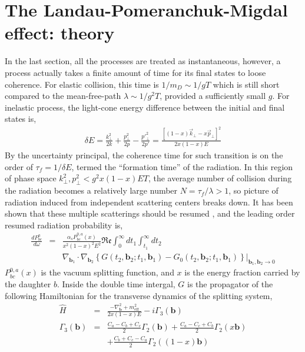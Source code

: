 \section{The Landau-Pomeranchuk-Migdal effect: theory}
In the last section, all the processes are treated as instantaneous, however, a process actually takes a finite amount of time for its final states to loose coherence. 
For elastic collision, this time is $1/m_D \sim 1/gT$ which is still short compared to the mean-free-path $\lambda \sim 1/g^2 T$, provided a sufficiently small $g$.
For inelastic process, the light-cone energy difference between the initial and final states is,
\begin{eqnarray}
\delta E = \frac{k_\perp^2}{2k} + \frac{p_\perp^2}{2p} - \frac{{p'}_\perp^2}{2{p'}} = \frac{ [(1-x)\vec{k}_\perp - x\vec{p}_\perp]^2}{2x(1-x)E}
\end{eqnarray}
By the uncertainty principal, the coherence time for such transition is on the order of $\tau_f = 1/\delta E$, termed the ``formation time'' of the radiation. 
In this region of phase space $k_\perp^2, p_\perp^2 < g^2x(1-x)ET$, the average number of collision during the radiation becomes a relatively large number $N = \tau_f/\lambda >1$, so picture of radiation induced from independent scattering centers breaks down.
It has been shown that these multiple scatterings should be resumed \cite{Zakharov:1996fv,Zakharov:1997uu,Baier:1996kr}, and the leading order resumed radiation probability is,
\begin{eqnarray}
\nonumber
\frac{dP^{a}_{bc}}{d\omega} &=& \frac{\alpha_s P^{0,a}_{bc}(x)}{x^2(1-x)^2 E^2}\mathfrak{Re}\int_0^\infty dt_1 \int_{t_1}^{\infty} dt_2\\ &&\nabla_{\mathbf{b}_1} \cdot\nabla_{\mathbf{b}_2} \left\{G(t_2, \mathbf{b}_2; t_1, \mathbf{b}_1) - G_0(t_2, \mathbf{b}_2; t_1, \mathbf{b}_1) \right\}|_{\mathbf{b}_1, \mathbf{b}_2 \rightarrow 0}
\label{eq:theory-dR}
\end{eqnarray}
$P^{0,a}_{bc}(x)$ is the vacuum splitting function, and $x$ is the energy fraction carried by the daughter $b$.
Inside the double time intergal, $G$ is the propagator of the following Hamiltonian for the transverse dynamics of the splitting system,
\begin{eqnarray}
\hat{H} &=& \frac{-\nabla^2_{\mathbf{b}} + m^2_\textrm{eff}}{2x(1-x)E} - i \Gamma_3(\mathbf{b})\\
\Gamma_3(\mathbf{b}) &=& \frac{C_a-C_b+C_c}{2}\Gamma_2(\mathbf{b}) + \frac{C_a-C_c+C_b}{2}\Gamma_2(x\mathbf{b}) \\
&&+ \frac{C_b+C_c-C_a}{2}\Gamma_2((1-x)\mathbf{b})
\end{eqnarray}
